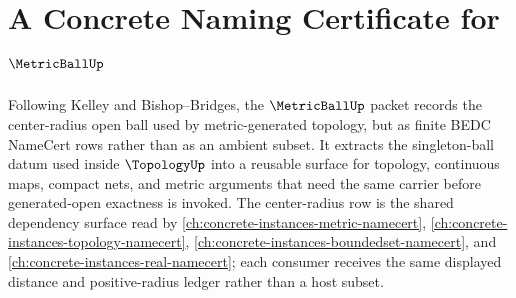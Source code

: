 \chapter{A Concrete Naming Certificate for $\MetricBallUp$}
\label{ch:concrete-instances-metricball-namecert}

Following Kelley and Bishop--Bridges, the $\MetricBallUp$ packet records the center-radius open ball used by metric-generated topology, but as finite BEDC NameCert rows rather than as an ambient subset. It extracts the singleton-ball datum used inside $\TopologyUp$ into a reusable surface for topology, continuous maps, compact nets, and metric arguments that need the same carrier before generated-open exactness is invoked.
The center-radius row is the shared dependency surface read by \autoref{ch:concrete-instances-metric-namecert}, \autoref{ch:concrete-instances-topology-namecert}, \autoref{ch:concrete-instances-boundedset-namecert}, and \autoref{ch:concrete-instances-real-namecert}; each consumer receives the same displayed distance and positive-radius ledger rather than a host subset.

